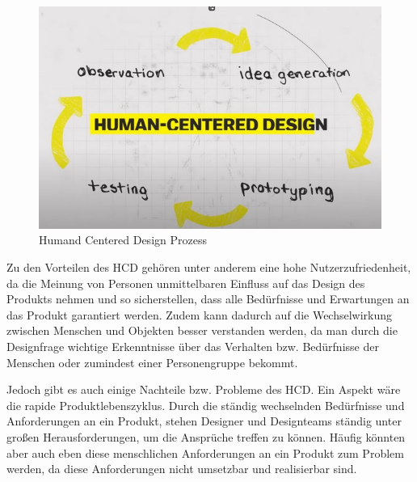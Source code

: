 \begin{figure}[h]
    \centering
    \includegraphics[width=1\textwidth]{images/03/HCD.jpg}
    \caption{Humand Centered Design Prozess}
\end{figure}

Zu den Vorteilen des HCD gehören unter anderem eine hohe Nutzerzufriedenheit, da die Meinung von Personen unmittelbaren Einfluss auf das Design des Produkts nehmen und so sicherstellen, dass alle Bedürfnisse und Erwartungen an das Produkt garantiert werden. Zudem kann dadurch auf die Wechselwirkung zwischen Menschen und Objekten besser verstanden werden, da man durch die Designfrage wichtige Erkenntnisse über das Verhalten bzw. Bedürfnisse der Menschen oder zumindest einer Personengruppe bekommt.


Jedoch gibt es auch einige Nachteile bzw. Probleme des HCD. Ein Aspekt wäre die rapide Produktlebenszyklus. Durch die ständig wechselnden Bedürfnisse und Anforderungen an ein Produkt, stehen Designer und Designteams ständig unter großen Herausforderungen, um die Ansprüche treffen zu können. Häufig könnten aber auch eben diese menschlichen Anforderungen an ein Produkt zum Problem werden, da diese Anforderungen nicht umsetzbar und realisierbar sind.\cite{pod:2016}



